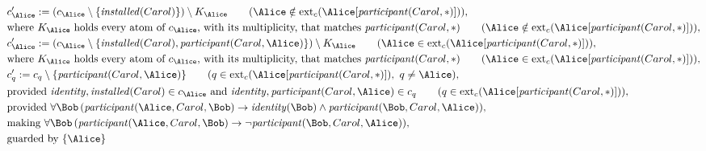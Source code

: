 \begin{align*}
&
c'_
{
\Alice
}
 := 
(c_
{
\Alice
}
 \setminus 
\{
\mathit{
installed
}
(
Carol
)
\}
) \setminus K_
{
\Alice
}
 \qquad (
\Alice
 \notin 
\mathrm{ext}_c(
\Alice
[
\mathit{
participant
}
(
Carol
,
\ast
)
]
)
)
,\\
&
\text{where } K_
{
\Alice
}
 \text{ holds every atom of } c_
{
\Alice
}
 \text{, with its multiplicity, that matches } 
\mathit{
participant
}
(
Carol
,
\ast
)
 \qquad (
\Alice
 \notin 
\mathrm{ext}_c(
\Alice
[
\mathit{
participant
}
(
Carol
,
\ast
)
]
)
)
,\\
&
c'_
{
\Alice
}
 := 
(c_
{
\Alice
}
 \setminus 
\{
\mathit{
installed
}
(
Carol
)
,
\mathit{
participant
}
(
Carol
,
\Alice
)
\}
) \setminus K_
{
\Alice
}
 \qquad (
\Alice
 \in 
\mathrm{ext}_c(
\Alice
[
\mathit{
participant
}
(
Carol
,
\ast
)
]
)
)
,\\
&
\text{where } K_
{
\Alice
}
 \text{ holds every atom of } c_
{
\Alice
}
 \text{, with its multiplicity, that matches } 
\mathit{
participant
}
(
Carol
,
\ast
)
 \qquad (
\Alice
 \in 
\mathrm{ext}_c(
\Alice
[
\mathit{
participant
}
(
Carol
,
\ast
)
]
)
)
,\\
&
c'_
q
 := 
c_
q
 \setminus 
\{
\mathit{
participant
}
(
Carol
,
\Alice
)
\}
 \qquad (
q
 \in 
\mathrm{ext}_c(
\Alice
[
\mathit{
participant
}
(
Carol
,
\ast
)
]
)
,\ 
q \neq 
\Alice
)
,\\
&
\text{provided } 
\mathit{
identity
}
,
\mathit{
installed
}
(
Carol
)
 \in c_
{
\Alice
}
 \text{ and } 
\mathit{
identity
}
,
\mathit{
participant
}
(
Carol
,
\Alice
)
 \in c_
q
 \qquad (
q \in 
\mathrm{ext}_c(
\Alice
[
\mathit{
participant
}
(
Carol
,
\ast
)
]
)
)
,\\
&
\text{provided } 
\forall 
\Bob
\,(
\mathit{
participant
}
(
\Alice
,
Carol
,
\Bob
)
\rightarrow
\mathit{
identity
}
(
\Bob
)
\land
\mathit{
participant
}
(
\Bob
,
Carol
,
\Alice
)
)
,\\
&
\text{making } 
\forall 
\Bob
\,(
\mathit{
participant
}
(
\Alice
,
Carol
,
\Bob
)
\rightarrow
\neg 
\mathit{
participant
}
(
\Bob
,
Carol
,
\Alice
)
)
,\\
&
\text{guarded by } \{
\Alice
\}
\end{align*}
